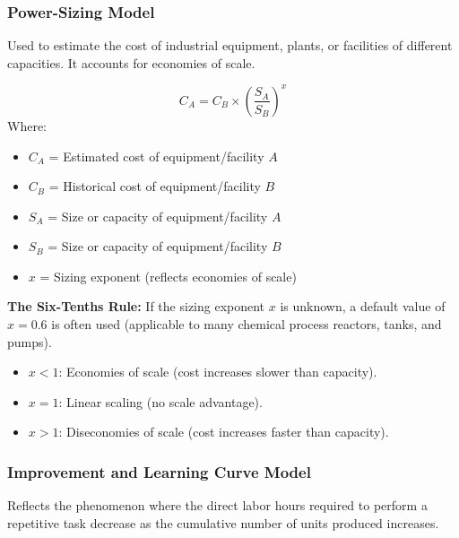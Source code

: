 \documentclass[12pt,a4paper]{article}
\begin{document}
\subsubsection{Power-Sizing Model}
Used to estimate the cost of industrial equipment, plants, or facilities of different capacities. It accounts for economies of scale.

\begin{tcolorbox}[formulabox, title={\textbf{Power-Sizing Formula}}]
\begin{equation}
  C_A = C_B \times \left( \frac{S_A}{S_B} \right)^x
\end{equation}
Where:
\begin{itemize}[leftmargin=1.5em, itemsep=1pt, topsep=2pt]
  \item[] $C_A$ = Estimated cost of equipment/facility $A$
  \item[] $C_B$ = Historical cost of equipment/facility $B$
  \item[] $S_A$ = Size or capacity of equipment/facility $A$
  \item[] $S_B$ = Size or capacity of equipment/facility $B$
  \item[] $x$ = Sizing exponent (reflects economies of scale)
\end{itemize}
\par\vspace{4pt}
\textbf{The Six-Tenths Rule:} If the sizing exponent $x$ is unknown, a default value of $x = 0.6$ is often used (applicable to many chemical process reactors, tanks, and pumps).
\begin{itemize}[leftmargin=*, itemsep=2pt, topsep=2pt]
  \item[] $x < 1$: Economies of scale (cost increases slower than capacity).
  \item[] $x = 1$: Linear scaling (no scale advantage).
  \item[] $x > 1$: Diseconomies of scale (cost increases faster than capacity).
\end{itemize}
\end{tcolorbox}

\subsubsection{Improvement and Learning Curve Model}
Reflects the phenomenon where the direct labor hours required to perform a repetitive task decrease as the cumulative number of units produced increases.
\end{document}
